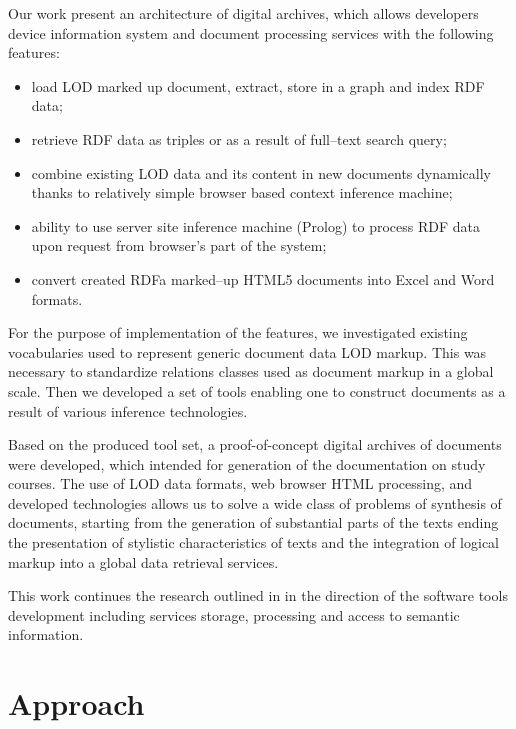 \documentclass[conference,a4paper]{IEEEtran}
\begin{document}
Our work present an architecture of digital archives, which allows
developers device information system and document processing services
with the following features:
\begin{itemize}
\item load LOD marked up document, extract, store in a graph and index RDF data;
\item retrieve RDF data as triples or as a result of full--text search query;
\item combine existing LOD data and its content in new documents dynamically
  thanks to relatively simple browser based context inference machine;
\item ability to use server site inference machine (Prolog) to process RDF data upon
  request from browser's part of the system;
\item convert created RDFa marked--up HTML5 documents into Excel and Word formats.
\end{itemize}

For the purpose of implementation of the features, we investigated existing
vocabularies used to represent generic document data LOD markup.  This was necessary to standardize relations classes used as document markup in a global scale.  Then we developed a set of tools enabling one to construct documents as a result of various inference technologies.

Based on the produced tool set, a proof-of-concept digital archives of documents were developed, which intended for generation of the documentation on study courses.  The use of LOD data formats, web browser HTML processing, and developed technologies allows us to solve a wide class of problems of synthesis of documents, starting from the generation of substantial parts of the texts ending the presentation of stylistic characteristics of texts and the integration of logical markup into a global data retrieval services.

This work continues the research outlined in \cite{b2} in the direction of the software tools development including services storage, processing and access to semantic information.

\section{Approach}
\end{document}
